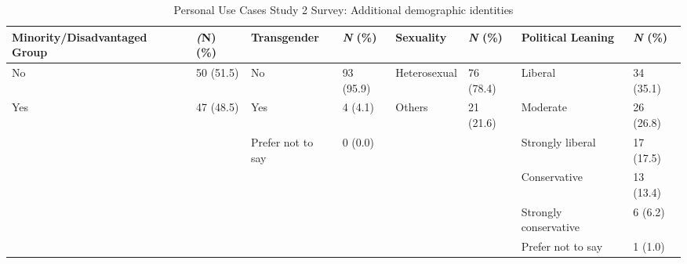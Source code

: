 \begin{table*}[htpb]
    \centering
    \footnotesize
    \begin{tabular}{ll|ll|ll|ll}
    \toprule
         \textbf{Minority/Disadvantaged Group} & \textbf{\textit(N) (\%)} & \textbf{Transgender} & \textbf{\textit{N} (\%)} & \textbf{Sexuality} & \textbf{\textit{N} (\%)} & \textbf{Political Leaning} & \textbf{\textit{N} (\%)} \\
         \midrule
No & 50 (51.5) & No & 93 (95.9) & Heterosexual & 76 (78.4) & Liberal & 34 (35.1)\\
Yes & 47 (48.5) & Yes & 4 (4.1) & Others & 21 (21.6) & Moderate & 26 (26.8)\\
 &  & Prefer not to say & 0 (0.0) & & & Strongly liberal & 17 (17.5)\\
 &  &  &  &  &  & Conservative & 13 (13.4)\\
 &  &  &  &  &  & Strongly conservative & 6 (6.2)\\
 &  &  &  &  &  & Prefer not to say & 1 (1.0)\\
\bottomrule
    \end{tabular}
    \caption{Personal Use Cases Study 2 Survey: Additional demographic identities}
    \label{app:demographics-2-personal-p2}
\end{table*}